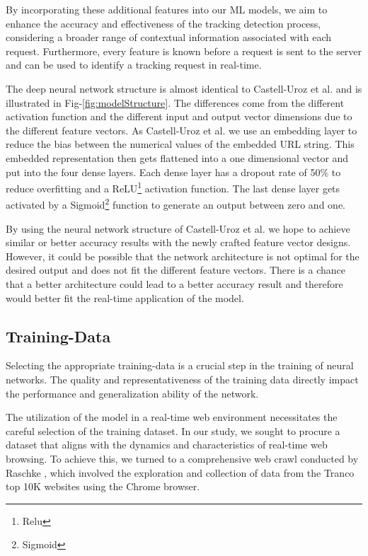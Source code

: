 By incorporating these additional features into our ML models, we aim to enhance the accuracy and effectiveness of
the tracking detection process, considering a broader range of contextual information associated with each request. 
Furthermore, every feature is known before a request is sent to the server and can be used to identify a tracking request
in real-time.

The deep neural network structure is almost identical to Castell-Uroz et al. \cite{castell2020url} and is illustrated in Fig-\ref{fig:modelStructure}.
The differences come from the different activation
function and the different input and output vector dimensions due to the different feature vectors. As Castell-Uroz et al. we use an embedding layer to reduce the bias between the numerical values of the embedded URL string. This embedded 
representation then gets flattened into a one dimensional vector and put into the four dense layers. Each dense layer has a dropout rate of 50\% to reduce
overfitting and a ReLU\footnote{Relu} activation function. The last dense layer gets activated by a Sigmoid\footnote{Sigmoid} function to generate an output
between zero and one.

By using the neural network structure of Castell-Uroz et al. we hope to achieve similar or better accuracy results with 
the newly crafted feature vector designs. However, it could be possible that the network architecture is not optimal
for the desired output and does not fit the different feature vectors. There is a chance that a better architecture could 
lead to a better accuracy result and therefore would better fit the real-time application of the model.

\subsection{Training-Data}

Selecting the appropriate training-data is a crucial step in the training of neural networks. The quality and representativeness 
of the training data directly impact the performance and generalization ability of the network.

The utilization of the model in a real-time web environment necessitates the careful selection of the training dataset.
In our study, we sought to procure a dataset that aligns with the dynamics and characteristics of real-time web browsing.
To achieve this, we turned to a comprehensive web crawl conducted by Raschke \cite{raschke_philip_2022_7123945}, which involved the exploration and collection
of data from the Tranco top 10K websites using the Chrome browser.

